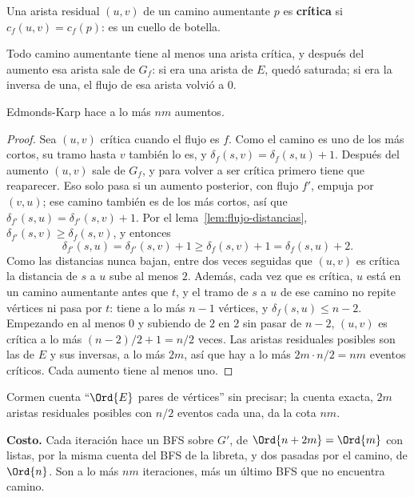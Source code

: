 \documentclass[11pt,letterpaper]{article}
\begin{document}
\begin{definicion}
  Una arista residual $(u, v)$ de un camino aumentante $p$ es
  \textbf{crítica} si $c_f(u, v) = c_f(p)$: es un cuello de botella.
\end{definicion}

Todo camino aumentante tiene al menos una arista crítica, y después
del aumento esa arista sale de $G_f$: si era una arista de $E$, quedó
saturada; si era la inversa de una, el flujo de esa arista volvió a
$0$.

\begin{teorema}\label{teo:flujo-ek-aumentos}
  Edmonds-Karp hace a lo más $n m$ aumentos.
\end{teorema}

\begin{proof}
  Sea $(u, v)$ crítica cuando el flujo es $f$. Como el camino es uno
  de los más cortos, su tramo hasta $v$ también lo es, y
  $\delta_f(s, v) = \delta_f(s, u) + 1$. Después del aumento $(u, v)$
  sale de $G_f$, y para volver a ser crítica primero tiene que
  reaparecer. Eso solo pasa si un aumento posterior, con flujo $f'$,
  empuja por $(v, u)$; ese camino también es de los más cortos, así
  que $\delta_{f'}(s, u) = \delta_{f'}(s, v) + 1$. Por el
  lema~\ref{lem:flujo-distancias}, $\delta_{f'}(s, v) \ge
  \delta_f(s, v)$, y entonces
  \[
    \delta_{f'}(s, u) = \delta_{f'}(s, v) + 1 \ge \delta_f(s, v) + 1
    = \delta_f(s, u) + 2 .
  \]
  Como las distancias nunca bajan, entre dos veces seguidas que
  $(u, v)$ es crítica la distancia de $s$ a $u$ sube al menos $2$.
  Además, cada vez que es crítica, $u$ está en un camino aumentante
  antes que $t$, y el tramo de $s$ a $u$ de ese camino no repite
  vértices ni pasa por $t$: tiene a lo más $n - 1$ vértices, y
  $\delta_f(s, u) \le n - 2$. Empezando en al menos $0$ y subiendo de
  $2$ en $2$ sin pasar de $n - 2$, $(u, v)$ es crítica a lo más
  $(n - 2)/2 + 1 = n/2$ veces. Las aristas residuales posibles son las
  de $E$ y sus inversas, a lo más $2m$, así que hay a lo más
  $2m \cdot n/2 = nm$ eventos críticos. Cada aumento tiene al menos
  uno.
\end{proof}

Cormen cuenta ``$\Ord{E}$ pares de vértices'' sin precisar; la cuenta
exacta, $2m$ aristas residuales posibles con $n/2$ eventos cada una,
da la cota $nm$.

\textbf{Costo.} Cada iteración hace un BFS sobre $G'$, de
$\Ord{n + 2m} = \Ord{m}$ con listas, por la misma cuenta del BFS de la
libreta, y dos pasadas por el camino, de $\Ord{n}$. Son a lo más $nm$
iteraciones, más un último BFS que no encuentra camino.
\end{document}
